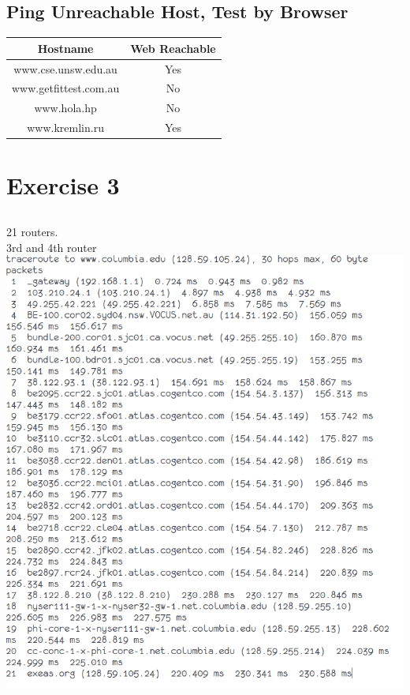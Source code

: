 \documentclass{article}
\begin{document}
\subsection{Ping Unreachable Host, Test by Browser}
\begin{tabular}{|c|c|}
    \hline
    Hostname & Web Reachable\\
    \hline
    www.cse.unsw.edu.au   &Yes \\
    www.getfittest.com.au &No \\
    www.hola.hp           &No \\
    www.kremlin.ru        &Yes \\
    \hline
\end{tabular}

\section{Exercise 3}
\subsection{}
21 routers.\\
3rd and 4th router \\

\includegraphics[width=\textwidth]{img/tr_columbia.png}
\end{document}
